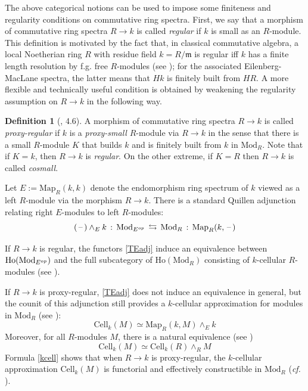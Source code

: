 \documentclass[11pt]{amsart}
\theoremstyle{definition}
\newtheorem{defi}[theorem]{Definition}
\theoremstyle{remark}
\numberwithin{equation}{section}
\newcommand{\la}{\label}
\newcommand{\Map}{\mathrm{Map}}
\newcommand{\Ho}{\mathrm{Ho}}
\newcommand{\Cell}{\mathrm{Cell}}
\def\Mod{\mathrm{Mod}}
\begin{document}
The above categorical notions can be used to impose some finiteness and regularity conditions on commutative ring spectra. First, we say that a morphism of commutative ring spectra $ R \to k $ is called {\it regular} if $k$ is small as an $R$-module. This definition is motivated by the fact that, in classical commutative algebra, a local Noetherian ring $ R $ with residue field $ k = R/\mathfrak{m}$ is regular iff $k$ has a finite length resolution by f.g. free $R$-modules (see \cite{Se00}); for the associated Eilenberg-MacLane spectra, the latter means that $Hk$ is finitely built from $HR$. A more flexible and technically useful condition is obtained by weakening the regularity assumption on $ R \to k$ in the following way.
%
\begin{defi}[\cite{DGI06}, 4.6]
\la{preg}
A morphism of commutative ring spectra $ R \to k $ is called {\it  proxy-regular} if $k$ is a {\it proxy-small} $R$-module via $ R \to k $ in the sense that there is a small $R$-module $K$ that builds $k$ and is finitely built from $k$ in $\Mod_R$. Note that if $K=k$, then $ R\to k $ is {\it regular}. On the other extreme, if $ K = R $ then $ R \to k $ is called {\it cosmall}.
\end{defi}
%

Let $ E := \Map_R(k,k)$ denote the endomorphism ring spectrum of $k$ viewed as a left $R$-module via the morphism $ R \to k $. There is a standard Quillen adjunction relating right $E$-modules to left $R$-modules:
%
\begin{equation}\la{TEadj}
(\,\mbox{--}\,) \wedge_E k\, :\, \Mod_{E^{\rm op}}\,\leftrightarrows\,\Mod_R\,:\, \Map_R(k,\,\mbox{--}\,)
\end{equation}
%

If $R \to k $ is regular, the functors  \eqref{TEadj} induce an 
equivalence between $ \Ho(\Mod_{E^{\rm op}})$ and the full subcategory of $ \Ho(\Mod_R)$ consisting of $k$-cellular $R$-modules (see \cite[Theorem 6.1]{G18}).

If $ R \to k $ is proxy-regular, \eqref{TEadj} does not induce an 
equivalence in general, but the counit of this adjunction still provides a $k$-cellular approximation for modules in $ \Mod_R$ (see \cite[Lemma 6.3]{G18}): %
%
\begin{equation}
\la{kcell}
\Cell_k(M) \simeq \Map_R(k, M) \wedge_E k    
\end{equation}
%
Moreover, for all $R$-modules $ M $, there is a natural equivalence (see \cite[Lemma 6.6]{G18})
%
\begin{equation}
\la{kcell1}
\Cell_k(M) \simeq \Cell_k(R) \wedge_R M    
\end{equation}
%
Formula \eqref{kcell} shows that when $ R\to k $ is proxy-regular, the $k$-cellular approximation $ \Cell_k(M)$ is functorial and effectively constructible in $  \Mod_R $ ({\it cf.} \cite[Definition 4.3]{DGI06}).
\end{document}
